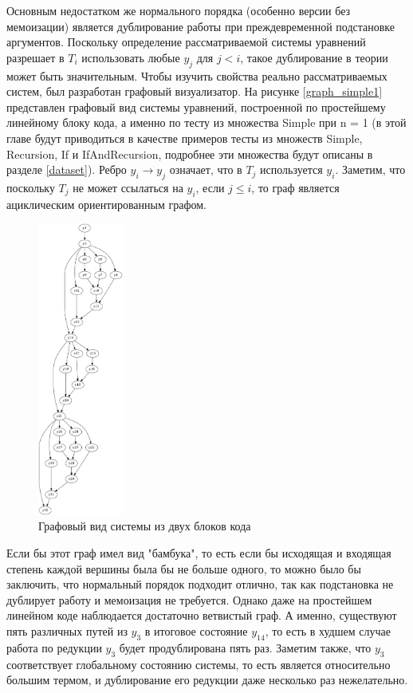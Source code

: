 \documentclass[../thesis.tex]{subfiles}
\begin{document}
Основным недостатком же нормального порядка (особенно версии без мемоизации) является дублирование работы при преждевременной подстановке аргументов. Поскольку определение рассматриваемой системы уравнений разрешает в $T_i$ использовать любые $y_j$ для $j < i$, такое дублирование в теории может быть значительным. Чтобы изучить свойства реально рассматриваемых систем, был разработан графовый визуализатор. На рисунке \ref{graph_simple1} представлен графовый вид системы уравнений, построенной по простейшему линейному блоку кода, а именно по тесту из множества Simple при n = 1 (в этой главе будут приводиться в качестве примеров тесты из множеств Simple, Recursion, If и IfAndRecursion, подробнее эти множества будут описаны в разделе \ref{dataset}). Ребро $y_i \rightarrow y_j$ означает, что в $T_j$ используется $y_i$. Заметим, что поскольку $T_j$ не может ссылаться на $y_i$, если $j \le i$, то граф является ациклическим ориентированным графом. 

\begin{figure}
    \centering
    \includegraphics[width=0.25\textwidth]{graph_simple2.png}
    \caption{Графовый вид системы из двух блоков кода}\label{graph_simple2}
\end{figure}

Если бы этот граф имел вид "бамбука", то есть если бы исходящая и входящая степень каждой вершины была бы не больше одного, то можно было бы заключить, что нормальный порядок подходит отлично, так как подстановка не дублирует работу и мемоизация не требуется. Однако даже на простейшем линейном коде наблюдается достаточно ветвистый граф. А именно, существуют пять различных путей из $y_3$ в итоговое состояние $y_{14}$, то есть в худшем случае работа по редукции $y_3$ будет продублирована пять раз. Заметим также, что $y_3$ соответствует глобальному состоянию системы, то есть является относительно большим термом, и дублирование его редукции даже несколько раз нежелательно.
\end{document}
